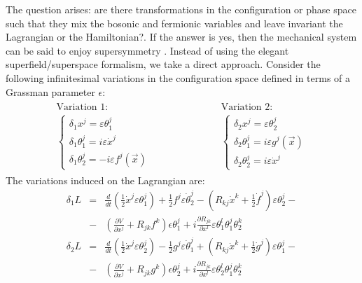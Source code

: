 \documentclass[a4paper,11pt,twoside]{article}
\begin{document}
The question arises: are there transformations in the
configuration or phase space such that they mix the bosonic and
fermionic variables and leave invariant the Lagrangian or the
Hamiltonian?. If the answer is yes, then the mechanical system can
be said to enjoy supersymmetry \cite{Fr}. Instead of using the
elegant superfield/superspace formalism, we take a direct
approach. Consider the following infinitesimal variations in the
configuration space defined in terms of a Grassman parameter
$\epsilon$:
\[
\begin{array}{lcl}
\begin{array}{c} \mbox{Variation 1:} \\
\left\{ \begin{array}{l} \delta_1 x^j=\varepsilon \theta_1^j \\
\delta_1 \theta_1^j= i \varepsilon \dot{x}^j \\ \delta_1
\theta_2^j=-i \varepsilon f^j(\vec{x}) \end{array} \right.
\end{array} & \hspace{2cm} & \begin{array}{c}
\mbox{Variation 2:} \\ \left\{ \begin{array}{l} \delta_2
x^j=\varepsilon \theta_2^j \\ \delta_2 \theta_1^j= i \varepsilon
g^j(\vec{x}) \\ \delta_2 \theta_2^j= i \varepsilon \dot{x}^j
\end{array} \right. \end{array}
\end{array}
\]
The variations induced on the Lagrangian are:
\begin{eqnarray*}
\delta_1 L&= & \displaystyle\frac{d}{dt}\left( \displaystyle\frac{1}{2} \dot{x}^j \varepsilon \theta_1^j \right) +\displaystyle\frac{1}{2} f^j \varepsilon \dot{\theta}_2^j- \left(R_{kj} \dot{x}^k+\displaystyle\frac{1}{2} \dot{f}^j \right) \varepsilon \theta_2^j- \\
&-& \left(\displaystyle\frac{\partial V}{\partial x^j}+ R_{jk} f^k \right) \epsilon \theta_1^j+
i \displaystyle\frac{\partial R_{jk}}{\partial x^l} \varepsilon \theta_1^l \theta_1^j \theta_2^k
\\
\delta_2 L&=& \displaystyle\frac{d}{dt}\left( \displaystyle\frac{1}{2} \dot{x}^j \varepsilon \theta_2^j \right) - \displaystyle\frac{1}{2} g^j \varepsilon \dot{\theta}_1^j+ \left(R_{kj} \dot{x}^k+\displaystyle\frac{1}{2} \dot{g}^j \right) \varepsilon \theta_1^j-\\ &-&\left(\displaystyle\frac{\partial V}{\partial x^j}+ R_{jk} g^k \right) \epsilon \theta_2^j+ i \displaystyle\frac{\partial R_{jk}}{\partial x^l} \varepsilon \theta_2^l \theta_1^j \theta_2^k
\end{eqnarray*}
\end{document}
